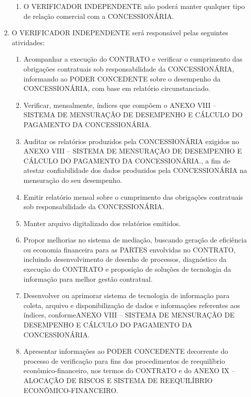 \documentclass[a4paper,11pt]{report} %
\begin{document}
\begin{enumerate}
\begin{enumerate}[label*=\arabic*.]
\item \label{itm:ZJ2F} O VERIFICADOR INDEPENDENTE não poderá manter qualquer tipo de relação comercial com a CONCESSIONÁRIA. 
\end{enumerate}

\item \label{itm:UX4C} O VERIFICADOR INDEPENDENTE será responsável pelas seguintes atividades: 

\begin{enumerate}[label*=\arabic*.]
\item \label{itm:5LSA} Acompanhar a execução do CONTRATO e verificar o cumprimento das obrigações contratuais sob responsabilidade da CONCESSIONÁRIA, informando ao PODER CONCEDENTE sobre o desempenho da CONCESSIONÁRIA, com base em relatório circunstanciado. 

\item \label{itm:N5F7} Verificar, mensalmente, índices que compõem o ANEXO VIII – SISTEMA DE MENSURAÇÃO DE DESEMPENHO E CÁLCULO DO PAGAMENTO DA CONCESSIONÁRIA. 

\item \label{itm:3KXB} Auditar os relatórios produzidos pela CONCESSIONÁRIA exigidos no ANEXO VIII – SISTEMA DE MENSURAÇÃO DE DESEMPENHO E CÁLCULO DO PAGAMENTO DA CONCESSIONÁRIA., a fim de atestar confiabilidade dos dados produzidos pela CONCESSIONÁRIA na mensuração do seu desempenho.

\item \label{itm:YCDN} Emitir relatório mensal sobre o cumprimento das obrigações contratuais sob responsabilidade da CONCESSIONÁRIA.

\item \label{itm:RUAX} Manter arquivo digitalizado dos relatórios emitidos.

\item \label{itm:YGKL} Propor melhorias no sistema de mediação, buscando geração de eficiência ou economia financeira para as PARTES envolvidas no CONTRATO, incluindo desenvolvimento de desenho de processos, diagnóstico da execução do CONTRATO e proposição de soluções de tecnologia da informação para melhor gestão contratual. 

\item \label{itm:XKF4} Desenvolver ou aprimorar sistema de tecnologia de informação para coleta, arquivo e disponibilização de dados e informações referentes aos índices, conformeANEXO VIII – SISTEMA DE MENSURAÇÃO DE DESEMPENHO E CÁLCULO DO PAGAMENTO DA CONCESSIONÁRIA. 

\item \label{itm:UXDZ} Apresentar informações ao PODER CONCEDENTE decorrente do processo de verificação para fins dos procedimentos de reequilíbrio econômico-financeiro, nos termos do CONTRATO e do ANEXO IX – ALOCAÇÃO DE RISCOS E SISTEMA DE REEQUILÍBRIO ECONÔMICO-FINANCEIRO. 


\end{enumerate}
\end{enumerate}
\end{document}
